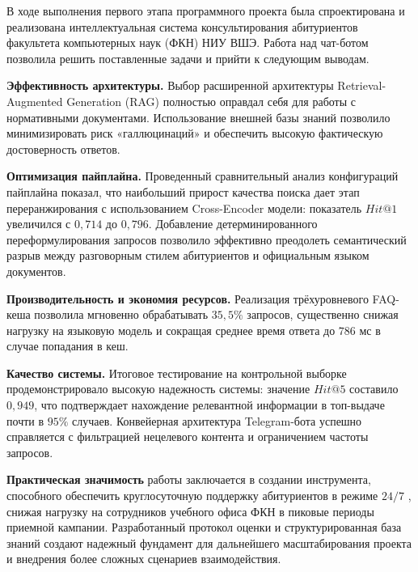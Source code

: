 \documentclass{article}
\begin{document}
В ходе выполнения первого этапа программного проекта была спроектирована и реализована интеллектуальная система консультирования абитуриентов факультета компьютерных наук (ФКН) НИУ ВШЭ. Работа над чат-ботом позволила решить поставленные задачи и прийти к следующим выводам.

\noindent\textbf{Эффективность архитектуры.} Выбор расширенной архитектуры Retrieval-Augmented Generation (RAG) полностью оправдал себя для работы с нормативными документами. Использование внешней базы знаний позволило минимизировать риск «галлюцинаций» и обеспечить высокую фактическую достоверность ответов.

\noindent\textbf{Оптимизация пайплайна.} Проведенный сравнительный анализ конфигураций пайплайна показал, что наибольший прирост качества поиска дает этап переранжирования с использованием Cross-Encoder модели: показатель $Hit@1$ увеличился с $0,714$ до $0,796$. Добавление детерминированного переформулирования запросов  позволило эффективно преодолеть семантический разрыв между разговорным стилем абитуриентов и официальным языком документов.

\noindent\textbf{Производительность и экономия ресурсов.} Реализация трёхуровневого FAQ-кеша позволила мгновенно обрабатывать $35,5\%$ запросов, существенно снижая нагрузку на языковую модель и сокращая среднее время ответа до $786$ мс в случае попадания в кеш.

\noindent\textbf{Качество системы.} Итоговое тестирование на контрольной выборке продемонстрировало высокую надежность системы: значение $Hit@5$ составило $0,949$, что подтверждает нахождение релевантной информации в топ-выдаче почти в $95\%$ случаев. Конвейерная архитектура Telegram-бота успешно справляется с фильтрацией нецелевого контента и ограничением частоты запросов.

\noindent\textbf{Практическая значимость} работы заключается в создании инструмента, способного обеспечить круглосуточную поддержку абитуриентов в режиме $24/7$ , снижая нагрузку на сотрудников учебного офиса ФКН в пиковые периоды приемной кампании. Разработанный протокол оценки и структурированная база знаний создают надежный фундамент для дальнейшего масштабирования проекта и внедрения более сложных сценариев взаимодействия.
\end{document}
